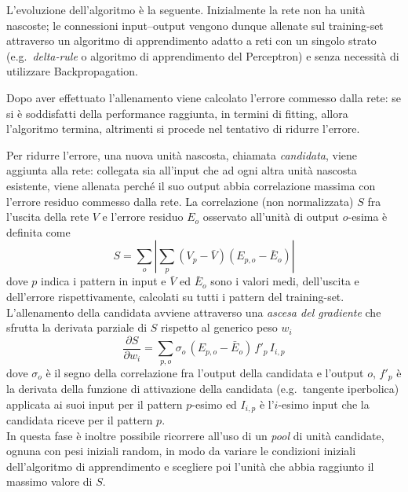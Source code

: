 L'evoluzione dell'algoritmo è la seguente. Inizialmente la rete non ha unità nascoste; le connessioni input--output vengono dunque allenate sul training-set attraverso un algoritmo di apprendimento adatto a reti con un singolo strato (e.g.\ \textit{delta-rule} o algoritmo di apprendimento del Perceptron) e senza necessità di utilizzare Backpropagation.

Dopo aver effettuato l'allenamento viene calcolato l'errore commesso dalla rete: se si è soddisfatti della performance raggiunta, in termini di fitting, allora l'algoritmo termina, altrimenti si procede nel tentativo di ridurre l'errore.

Per ridurre l'errore, una nuova unità nascosta, chiamata \emph{candidata}, viene aggiunta alla rete: collegata sia all'input che ad ogni altra unità nascosta esistente, viene allenata perché il suo output abbia correlazione massima con l'errore residuo commesso dalla rete. La correlazione (non normalizzata) $S$ fra l'uscita della rete $V$ e l'errore residuo $E_o$ osservato all'unità di output $o$-esima è definita come
\begin{equation}\label{eq:S}
S = \sum_o \left\lvert \sum_p (V_p - \bar{V}) (E_{p,o} - \bar{E}_o) \right\rvert
\end{equation}
dove $p$ indica i pattern in input e $\bar{V}$ ed $\bar{E}_o$ sono i valori medi, dell'uscita e dell'errore rispettivamente, calcolati su tutti i pattern del training-set.\\
L'allenamento della candidata avviene attraverso una \emph{ascesa del gradiente} che sfrutta la derivata parziale di $S$ rispetto al generico peso $w_i$
\begin{equation}
\dfrac{\partial S}{\partial w_i} = \sum_{p,o} \sigma_o \, (E_{p,o} - \bar{E}_o)\, f'_p \, I_{i,p}
\end{equation}
dove $\sigma_o$ è il segno della correlazione fra l'output della candidata e l'output $o$, $f'_p$ è la derivata della funzione di attivazione della candidata (e.g.\ tangente iperbolica) applicata ai suoi input per il pattern $p$-esimo ed $I_{i,p}$ è l'$i$-esimo input che la candidata riceve per il pattern $p$.\\
In questa fase è inoltre possibile ricorrere all'uso di un \emph{pool} di unità candidate, ognuna con pesi iniziali random, in modo da variare le condizioni iniziali dell'algoritmo di apprendimento e scegliere poi l'unità che abbia raggiunto il massimo valore di $S$.


